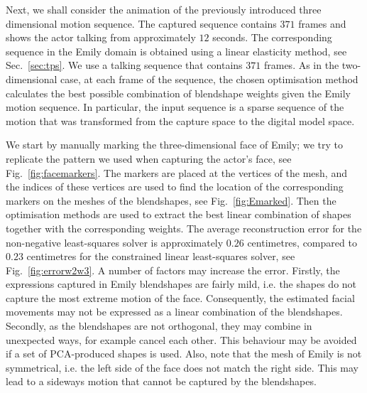 Next, we shall consider the animation of the previously introduced three dimensional motion sequence. The captured sequence contains $371$ frames and shows the actor talking from approximately $12$ seconds. The corresponding sequence in the Emily domain is obtained using a linear elasticity method, see Sec.~\ref{sec:tps}. We use a talking sequence that contains $371$ frames. As in the two-dimensional case, at each frame of the sequence, the chosen optimisation method calculates the best possible combination of blendshape weights given the Emily motion sequence. In particular, the input sequence is a sparse sequence of the motion that was transformed from the capture space to the digital model space. 

We start by manually marking the three-dimensional face of Emily; we try to replicate the pattern we used when capturing the actor's face, see Fig.~\ref{fig:facemarkers}. The markers are placed at the vertices of the mesh, and the indices of these vertices are used to find the location of the corresponding markers on the meshes of the blendshapes, see Fig.~\ref{fig:Emarked}. Then the optimisation methods are used to extract the best linear combination of shapes together with the corresponding weights. The average reconstruction error for the non-negative least-squares solver is approximately $0.26$ centimetres, compared to $0.23$ centimetres for the constrained linear least-squares solver, see Fig.~\ref{fig:errorw2w3}. A number of factors may increase the error. Firstly, the expressions captured in Emily blendshapes are fairly mild, i.e. the shapes do not capture the most extreme motion of the face. Consequently, the estimated facial movements may not be expressed as a linear combination of the blendshapes. Secondly, as the blendshapes are not orthogonal, they may combine in unexpected ways, for example cancel each other. This behaviour may be avoided if a set of PCA-produced shapes is used. Also, note that the mesh of Emily is not symmetrical, i.e. the left side of the face does not match the right side. This may lead to a sideways motion that cannot be captured by the blendshapes.
